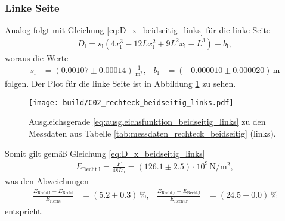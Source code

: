 \subsubsection{Linke Seite}
\label{sec:rechteck_beidseitig_links}
Analog folgt mit Gleichung \eqref{eq:D_x_beidseitig_links} für die linke Seite
\begin{align}
    D_\text{l} = s_\text{l} \left(4 x_\text{l}^3 - 12 L x_\text{l}^2 + 9 L^2 x_\text{l} - L^3\right) + b_\text{l}, 
    \label{eq:ausgleichsfunktion_beidseitig_links}
\end{align}
woraus die Werte 
\begin{align*}
    s_\text{l} &= (\num{0.00107} \pm \num{0.00014}) \, \frac{1}{\unit{\meter^2}}, & 
    b_\text{l} &= (\num{-0.000010} \pm \num{0.000020}) \, \unit{\meter}
\end{align*}
folgen.
Der Plot für die linke Seite ist in Abbildung \ref{fig:plot_rechteck_beidseitig_links}
zu sehen.
%
\begin{figure}[H]
    \centering
    \texttt{[image: build/C02\_rechteck\_beidseitig\_links.pdf]}
    \caption{Ausgleichsgerade \eqref{eq:ausgleichsfunktion_beidseitig_links} zu den Messdaten aus Tabelle \ref{tab:messdaten_rechteck_beidseitig} (links).}
    \label{fig:plot_rechteck_beidseitig_links}
\end{figure}

\noindent
Somit gilt gemäß Gleichung \eqref{eq:D_x_beidseitig_links}
\begin{align}
    E_\text{Recht,l} = \frac{F}{48 I s_\text{l}} = (\num{126.1} \pm \num{2.5}) \cdot 10^9 \, \unit{\newton\per\meter^2},
\end{align}
was den Abweichungen 
\begin{align*}
    \frac{E_\text{Recht,l} - E_\text{Recht}}{E_\text{Recht}} &= (\num{5.2} \pm \num{0.3}) \, \%, &
    \frac{E_\text{Recht,r} - E_\text{Recht,l}}{E_\text{Recht,r}} &= (\num{24.5} \pm \num{0.0}) \, \%
\end{align*}
entspricht.
